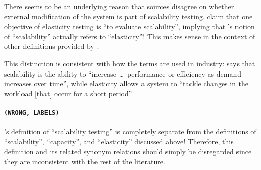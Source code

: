 There seems to be an underlying reason that sources disagree on whether
external modification of the system is part of scalability testing.
\citeauthor{SWEBOK2024} \citeyearpar[p.~5\=/9]{SWEBOK2024} claim that one
objective of elasticity testing is ``to evaluate scalability'', implying that
\citep{ISO_IEC2023a}'s notion of ``scalability'' actually refers to
``elasticity''! This makes sense in the context of other definitions
provided by \citet{SWEBOK2024}:
This distinction is consistent with how the terms are used in industry:
\citet{Pandey2023} says that scalability is the ability to
``increase \dots\ performance or efficiency as demand increases over time'',
while elasticity allows a system to ``tackle changes in the workload [that]
occur for a short period''.

\paragraph{\texttt{(WRONG, LABELS)}}

\citeauthor{SWEBOK2024} \citeyearpar[p.~5\=/9]{SWEBOK2024}'s definition of
``scalability testing'' is completely separate from the definitions of
``scalability'', ``capacity'', and ``elasticity'' discussed above! Therefore,
this definition and its related synonym relations should simply be disregarded
since they are inconsistent with the rest of the literature.

